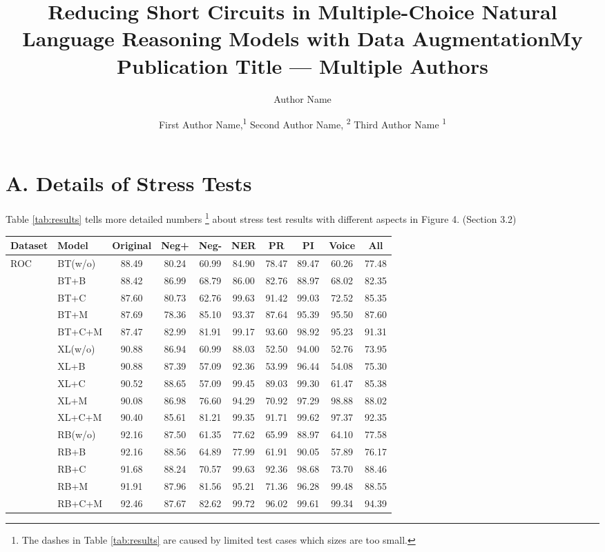\documentclass[runningheads]{llncs}
\title{Reducing Short Circuits in Multiple-Choice Natural Language Reasoning Models with Data Augmentation}
\author {
    Author Name
}
\title{My Publication Title --- Multiple Authors}
\author {
    First Author Name,\textsuperscript{\rm 1}
    Second Author Name, \textsuperscript{\rm 2}
    Third Author Name \textsuperscript{\rm 1}
}
\newcommand{\secref}[1]{Section \ref{#1}}
\newcommand{\tabref}[1]{Table \ref{#1}}
\newcommand{\KZ}[1]{\textcolor{blue}{Kenny: #1}}
\begin{document}
\section{A.  Details of Stress Tests}
\tabref{tab:results} tells more detailed numbers
\footnote{The dashes in \tabref{tab:results} are caused by limited test cases 
which sizes are too small.} 
about 
stress test results with different aspects in Figure 4. (Section 3.2)

\begin{table}[th]
\scriptsize
\centering
\begin{tabular}{ll|c|ccccccc}\hline
\toprule  
\textbf{Dataset}&\textbf{Model}&\textbf{Original} &\textbf{Neg+} & \textbf{Neg-} &\textbf{NER} &\textbf{PR} &\textbf{PI}&\textbf{Voice}&\textbf{All}
                                               \\ 
 \hline
 \multirow{15}{*}{ROC} 
&BT(w/o)&88.49 &80.24 &60.99 &84.90 &78.47 &89.47 &60.26 &77.48 \\ 
&BT+B&88.42 &86.99 &68.79 &86.00 &82.76 &88.97 &68.02 &82.35 \\ 
&BT+C&87.60 &80.73 &62.76 &99.63 &91.42 &99.03 &72.52 &85.35 \\ 
&BT+M&87.69 &78.36 &85.10 &93.37 &87.64 &95.39 &95.50 &87.60 \\ 
&BT+C+M&87.47 &82.99 &81.91 &99.17 &93.60 &98.92 &95.23 &91.31 \\ 
\cline{2-10}
&XL(w/o)&90.88 &86.94 &60.99 &88.03 &52.50 &94.00 &52.76 &73.95 \\ 
&XL+B&90.88 &87.39 &57.09 &92.36 &53.99 &96.44 &54.08 &75.30 \\ 
&XL+C&90.52 &88.65 &57.09 &99.45 &89.03 &99.30 &61.47 &85.38 \\ 
&XL+M&90.08 &86.98 &76.60 &94.29 &70.92 &97.29 &98.88 &88.02 \\ 
&XL+C+M&90.40 &85.61 &81.21 &99.35 &91.71 &99.62 &97.37 &92.35 \\ 
\cline{2-10}
&RB(w/o)&92.16 &87.50 &61.35 &77.62 &65.99 &88.97 &64.10 &77.58 \\ 
&RB+B&92.16 &88.56 &64.89 &77.99 &61.91 &90.05 &57.89 &76.17 \\ 
&RB+C&91.68 &88.24 &70.57 &99.63 &92.36 &98.68 &73.70 &88.46 \\ 
&RB+M&91.91 &87.96 &81.56 &95.21 &71.36 &96.28 &99.48 &88.55 \\ 
&RB+C+M&92.46 &87.67 &82.62 &99.72 &96.02 &99.61 &99.34 &94.39 \\ 
\hline

\end{tabular}
\end{table}
\end{document}
